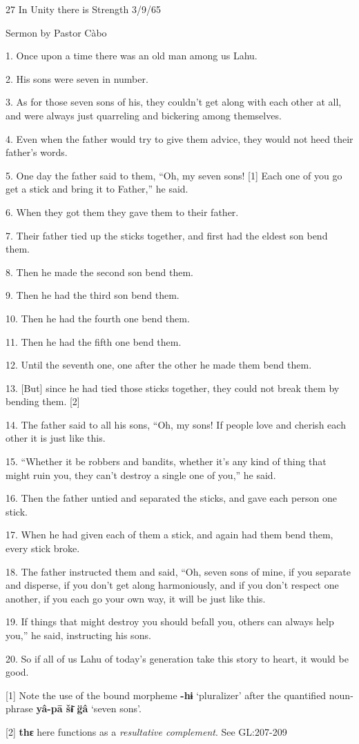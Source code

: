 
{\LARGE{}27 In Unity there is Strength 3/9/65}

{\LARGE{}Sermon by Pastor Càbo}

{\LARGE{}1. Once upon a time there was an old man among us Lahu.}

{\LARGE{}2. His sons were seven in number.}

{\LARGE{}3. As for those seven sons of his, they couldn't get along with each other
at all, and were always just quarreling and bickering among themselves.}

{\LARGE{}4. Even when the father would try to give them advice, they would not
heed their father's words.}

{\LARGE{}5. One day the father said to them, ``Oh, my seven sons! [1] Each one
of you go get a stick and bring it to Father,'' he said.}

{\LARGE{}6. When they got them they gave them to their father.}

{\LARGE{}7. Their father tied up the sticks together, and first had the eldest
son bend them.}

{\LARGE{}8. Then he made the second son bend them.}

{\LARGE{}9. Then he had the third son bend them.}

{\LARGE{}10. Then he had the fourth one bend them.}

{\LARGE{}11. Then he had the fifth one bend them.}

{\LARGE{}12. Until the seventh one, one after the other he made them bend them.}

{\LARGE{}13. [But] since he had tied those sticks together, they could not break
them by bending them. [2]}

{\LARGE{}14. The father said to all his sons, ``Oh, my sons! If people love and
cherish each other it is just like this.}

{\LARGE{}15. ``Whether it be robbers and bandits, whether it's any kind
of thing that might ruin you, they can't destroy a single one of you,'' he said.}

{\LARGE{}16. Then the father untied and separated the sticks, and gave each person
one stick.}

{\LARGE{}17. When he had given each of them a stick, and again had them bend them,
every stick broke.}

{\LARGE{}18. The father instructed them and said, ``Oh, seven sons of mine, if
you separate and disperse, if you don't get along harmoniously, and if you don't
respect one another, if you each go your own way, it will be just like this.}

{\LARGE{}19. If things that might destroy you should befall you, others can always
help you,'' he said, instructing his sons.}

{\LARGE{}20. So if all of us Lahu of today's generation take this story to heart,
it would be good.}

{\LARGE{}[1] Note the use of the bound morpheme }{\LARGE{}\textbf{-hɨ}}{\LARGE{}
`pluralizer' after the quantified noun-phrase }{\LARGE{}\textbf{yâ-pā šɨ̄
g̈â}}{\LARGE{} `seven sons'.}

{\LARGE{}[2] }{\LARGE{}\textbf{thɛ}}{\LARGE{} here functions as a }{\LARGE{}\textit{resultative
complement}}{\LARGE{}. See GL:207-209     }


